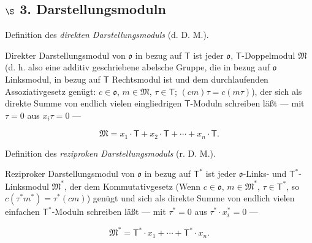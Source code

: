 \subsection*{\texorpdfstring{\(\S\) 3. Darstellungsmoduln}{\textbackslash S 3. Darstellungsmoduln}}\label{s-3.-darstellungsmoduln}

Definition des \emph{direkten Darstellungsmoduls} (d. D. M.).

Direkter Darstellungsmodul von \(\mathfrak{o}\) in bezug auf \(\mathsf T\) ist jeder \(\mathfrak{o}\), \(\mathsf T\)-Doppelmodul \(\mathfrak M\) (d. h. also eine additiv geschriebene abelsche Gruppe, die in bezug auf \(\mathfrak{o}\) Linksmodul, in bezug auf \(\mathsf T\) Rechtsmodul ist und dem durchlaufenden Assoziativgesetz genügt: \(c\in\mathfrak{o}\), \(m\in\mathfrak M\), \(\tau\in\mathsf T\); \((cm)\tau=c(m\tau)\)), der sich als direkte Summe von endlich vielen eingliedrigen \(\mathsf T\)-Moduln schreiben läßt --- mit \(\tau=0\) aus \(x_i\tau=0\) ---

\[
\mathfrak M=x_1\cdot\mathsf T+x_2\cdot\mathsf T+\cdots+x_n\cdot\mathsf T.
\]

Definition des \emph{reziproken Darstellungsmoduls} (r. D. M.).

Reziproker Darstellungsmodul von \(\mathfrak{o}\) in bezug auf \(\mathsf T^*\) ist jeder \(\mathfrak{o}\)-Links- und \(\mathsf T^*\)-Linksmodul \(\mathfrak M^*\), der dem Kommutativgesetz (Wenn \(c\in\mathfrak{o}\), \(m\in\mathfrak M^*\), \(\tau\in\mathsf T^*\), so \(c(\tau^*m^*)=\tau^*(cm)\)) genügt und sich als direkte Summe von endlich vielen einfachen \(\mathsf T^*\)-Moduln schreiben läßt --- mit \(\tau^*=0\) aus \(\tau^*\cdot x_i^*=0\) ---

\[
\mathfrak M^*=\mathsf T^*\cdot x_1+\cdots+\mathsf T^*\cdot x_n.
\]

